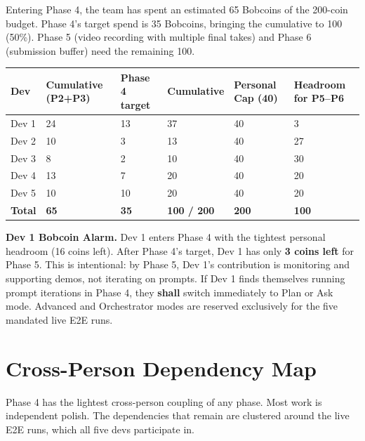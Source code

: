 \documentclass[11pt,letterpaper]{article}
\newcommand{\shall}{\textbf{shall}}
\begin{document}
Entering Phase 4, the team has spent an estimated 65 Bobcoins of the 200-coin budget. Phase 4's target spend is 35 Bobcoins, bringing the cumulative to 100 (50\%). Phase 5 (video recording with multiple final takes) and Phase 6 (submission buffer) need the remaining 100.

\begin{longtable}{|p{1.4cm}|p{2.3cm}|p{2.2cm}|p{2.2cm}|p{2.0cm}|p{2.7cm}|}
\hline
\rowcolor{ibmblue!10}
\textbf{Dev} & \textbf{Cumulative (P2+P3)} & \textbf{Phase 4 target} & \textbf{Cumulative} & \textbf{Personal Cap (40)} & \textbf{Headroom for P5--P6} \\
\hline
Dev 1 & 24 & 13 & 37 & 40 & 3 \\
\hline
Dev 2 & 10 & 3 & 13 & 40 & 27 \\
\hline
Dev 3 & 8 & 2 & 10 & 40 & 30 \\
\hline
Dev 4 & 13 & 7 & 20 & 40 & 20 \\
\hline
Dev 5 & 10 & 10 & 20 & 40 & 20 \\
\hline
\rowcolor{ibmblue!5}
\textbf{Total} & \textbf{65} & \textbf{35} & \textbf{100 / 200} & \textbf{200} & \textbf{100} \\
\hline
\end{longtable}

\begin{danger}
\textbf{Dev 1 Bobcoin Alarm.} Dev 1 enters Phase 4 with the tightest personal headroom (16 coins left). After Phase 4's target, Dev 1 has only \textbf{3 coins left} for Phase 5. This is intentional: by Phase 5, Dev 1's contribution is monitoring and supporting demos, not iterating on prompts. If Dev 1 finds themselves running prompt iterations in Phase 4, they \shall{} switch immediately to Plan or Ask mode. Advanced and Orchestrator modes are reserved exclusively for the five mandated live E2E runs.
\end{danger}

\section{Cross-Person Dependency Map}

Phase 4 has the lightest cross-person coupling of any phase. Most work is independent polish. The dependencies that remain are clustered around the live E2E runs, which all five devs participate in.
\end{document}
